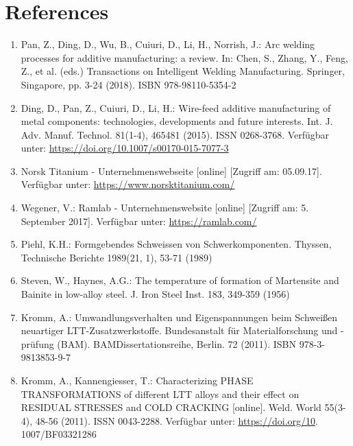 \documentclass[10pt]{article}
\begin{document}
\section*{References}
\begin{enumerate}
  \item Pan, Z., Ding, D., Wu, B., Cuiuri, D., Li, H., Norrish, J.: Arc welding processes for additive manufacturing: a review. In: Chen, S., Zhang, Y., Feng, Z., et al. (eds.) Transactions on Intelligent Welding Manufacturing. Springer, Singapore, pp. 3-24 (2018). ISBN 978-98110-5354-2

  \item Ding, D., Pan, Z., Cuiuri, D., Li, H.: Wire-feed additive manufacturing of metal components: technologies, developments and future interests. Int. J. Adv. Manuf. Technol. 81(1-4), 465481 (2015). ISSN 0268-3768. Verfügbar unter: \href{https://doi.org/10.1007/s00170-015-7077-3}{https://doi.org/10.1007/s00170-015-7077-3}

  \item Norsk Titanium - Unternehmenswebseite [online] [Zugriff am: 05.09.17]. Verfügbar unter: \href{https://www.norsktitanium.com/}{https://www.norsktitanium.com/}

  \item Wegener, V.: Ramlab - Unternehmenswebsite [online] [Zugriff am: 5. September 2017]. Verfügbar unter: \href{https://ramlab.com/}{https://ramlab.com/}

  \item Piehl, K.H.: Formgebendes Schweissen von Schwerkomponenten. Thyssen, Technische Berichte 1989(21, 1), 53-71 (1989)

  \item Steven, W., Haynes, A.G.: The temperature of formation of Martensite and Bainite in low-alloy steel. J. Iron Steel Inst. 183, 349-359 (1956)

  \item Kromm, A.: Umwandlungsverhalten und Eigenspannungen beim Schweißen neuartiger LTT-Zusatzwerkstoffe. Bundesanstalt für Materialforschung und -prüfung (BAM). BAMDissertationsreihe, Berlin. 72 (2011). ISBN 978-3-9813853-9-7

  \item Kromm, A., Kannengiesser, T.: Characterizing PHASE TRANSFORMATIONS of different LTT alloys and their effect on RESIDUAL STRESSES and COLD CRACKING [online]. Weld. World 55(3-4), 48-56 (2011). ISSN 0043-2288. Verfügbar unter: \href{https://doi.org/10}{https://doi.org/10}. 1007/BF03321286


\end{enumerate}
\end{document}
